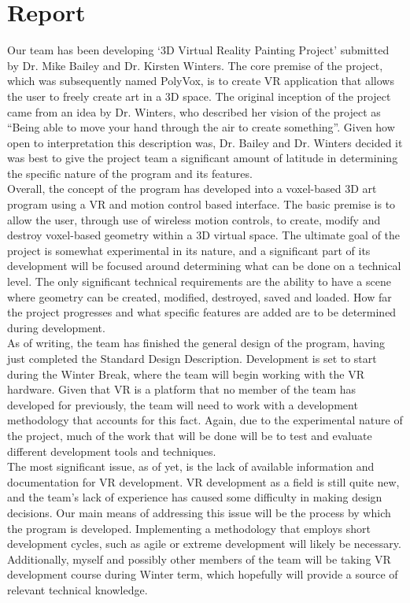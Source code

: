 \documentclass[onecolumn, draftclsnofoot,10pt, compsoc]{IEEEtran}
\begin{document}
\section{Report}
Our team has been developing ‘3D Virtual Reality Painting Project’ submitted by Dr. Mike Bailey and Dr. Kirsten Winters. The core premise of the project, which was subsequently named PolyVox, is to create VR application that allows the user to freely create art in a 3D space. The original inception of the project came from an idea by Dr. Winters, who described her vision of the project as “Being able to move your hand through the air to create something”. Given how open to interpretation this description was, Dr. Bailey and Dr. Winters decided it was best to give the project team a significant amount of latitude in determining the specific nature of the program and its features.\\

Overall, the concept of the program has developed into a voxel-based 3D art program using a VR and motion control based interface. The basic premise is to allow the user, through use of wireless motion controls, to create, modify and destroy voxel-based geometry within a 3D virtual space. The ultimate goal of the project is somewhat experimental in its nature, and a significant part of its development will be focused around determining what can be done on a technical level. The only significant technical requirements are the ability to have a scene where geometry can be created, modified, destroyed, saved and loaded. How far the project progresses and what specific features are added are to be determined during development.\\

As of writing, the team has finished the general design of the program, having just completed the Standard Design Description. Development is set to start during the Winter Break, where the team will begin working with the VR hardware. Given that VR is a platform that no member of the team has developed for previously, the team will need to work with a development methodology that accounts for this fact. Again, due to the experimental nature of the project, much of the work that will be done will be to test and evaluate different development tools and techniques.\\

The most significant issue, as of yet, is the lack of available information and documentation for VR development. VR development as a field is still quite new, and the team’s lack of experience has caused some difficulty in making design decisions. Our main means of addressing this issue will be the process by which the program is developed. Implementing a methodology that employs short development cycles, such as agile or extreme development will likely be necessary. Additionally, myself and possibly other members of the team will be taking VR development course during Winter term, which hopefully will provide a source of relevant technical knowledge.\\
\end{document}
